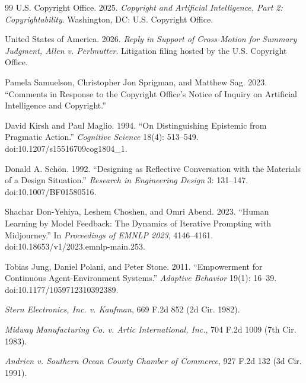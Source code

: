 \documentclass[11pt]{article}
\begin{document}
\begin{thebibliography}{99}
U.S. Copyright Office. 2025. \emph{Copyright and Artificial Intelligence, Part 2: Copyrightability}. Washington, DC: U.S. Copyright Office.

United States of America. 2026. \emph{Reply in Support of Cross-Motion for Summary Judgment, Allen v. Perlmutter}. Litigation filing hosted by the U.S. Copyright Office.

Pamela Samuelson, Christopher Jon Sprigman, and Matthew Sag. 2023. ``Comments in Response to the Copyright Office's Notice of Inquiry on Artificial Intelligence and Copyright.''

David Kirsh and Paul Maglio. 1994. ``On Distinguishing Epistemic from Pragmatic Action.'' \emph{Cognitive Science} 18(4): 513--549. doi:10.1207/s15516709cog1804\_1.

Donald A. Sch\"on. 1992. ``Designing as Reflective Conversation with the Materials of a Design Situation.'' \emph{Research in Engineering Design} 3: 131--147. doi:10.1007/BF01580516.

Shachar Don-Yehiya, Leshem Choshen, and Omri Abend. 2023. ``Human Learning by Model Feedback: The Dynamics of Iterative Prompting with Midjourney.'' In \emph{Proceedings of EMNLP 2023}, 4146--4161. doi:10.18653/v1/2023.emnlp-main.253.

Tobias Jung, Daniel Polani, and Peter Stone. 2011. ``Empowerment for Continuous Agent-Environment Systems.'' \emph{Adaptive Behavior} 19(1): 16--39. doi:10.1177/1059712310392389.

\emph{Stern Electronics, Inc. v. Kaufman}, 669 F.2d 852 (2d Cir. 1982).

\emph{Midway Manufacturing Co. v. Artic International, Inc.}, 704 F.2d 1009 (7th Cir. 1983).

\emph{Andrien v. Southern Ocean County Chamber of Commerce}, 927 F.2d 132 (3d Cir. 1991).
\end{thebibliography}
\end{document}
